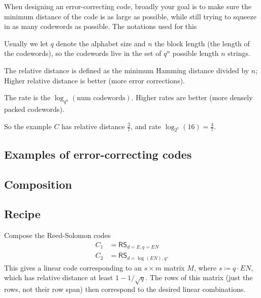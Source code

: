 \documentclass[11pt]{scrreprt}
\begin{document}
When designing an error-correcting code, broadly your goal is to make sure the
minimum distance of the code is as large as possible,
while still trying to squeeze in as many codewords as possible.
The notations used for this
\begin{itemize}
  \ii Usually we let $q$ denote the alphabet size and $n$ the block length
  (the length of the codewords),
  so the codewords live in the set of $q^n$ possible length $n$ strings.

  \ii The \alert{relative distance} is defined as the minimum Hamming distance divided by $n$;
  Higher relative distance is better (more error corrections).

  \ii The \alert{rate} is the $\log_{q^n}(\text{num codewords})$.
  Higher rates are better (more densely packed codewords).
\end{itemize}
So the example $C$ has relative distance $\frac 37$,
and rate $\log_{2^7}(16) = \frac 47$.

\subsection{Examples of error-correcting codes}

\subsection{Composition}

\subsection{Recipe}
Compose the Reed-Solomon codes
\begin{align*}
  C_1 &= \mathsf{RS}_{d=E,q=EN} \\
  C_2 &= \mathsf{RS}_{d=\log(EN),q}.
\end{align*}
This gives a linear code corresponding to an $s \times m$ matrix $M$,
where $s \coloneqq q \cdot EN$, which has relative distance at least $1 - 1/\sqrt q$.
The rows of this matrix (just the rows, not their row span)
then correspond to the desired linear combinations.

%
%
%
\end{document}
